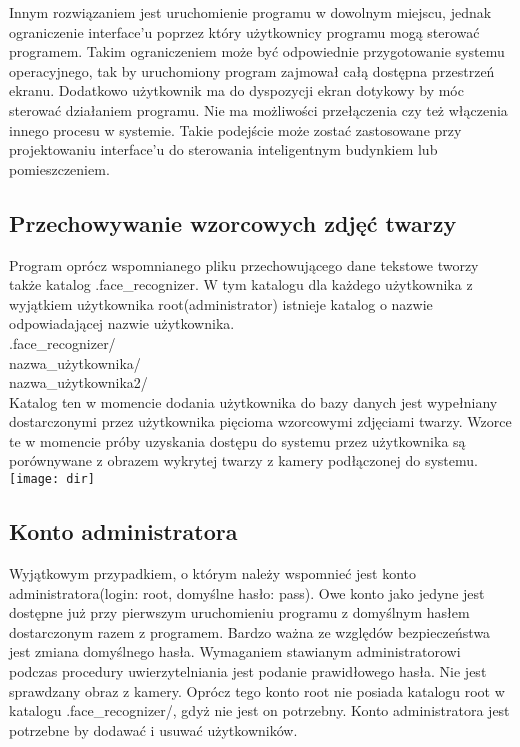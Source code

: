 \documentclass[eng,printmode]{mgr}
\begin{document}
Innym rozwiązaniem jest uruchomienie programu w dowolnym miejscu, jednak ograniczenie interface'u poprzez który użytkownicy programu mogą sterować programem. Takim ograniczeniem może być odpowiednie przygotowanie systemu operacyjnego, tak by uruchomiony program zajmował całą dostępna przestrzeń ekranu. Dodatkowo użytkownik ma do dyspozycji ekran dotykowy by móc sterować działaniem programu. Nie ma możliwości przełączenia czy też włączenia innego procesu w systemie. Takie podejście może zostać zastosowane przy projektowaniu interface'u do sterowania inteligentnym budynkiem lub pomieszczeniem.

\subsection{Przechowywanie wzorcowych zdjęć twarzy}
Program oprócz wspomnianego pliku przechowującego dane tekstowe tworzy także katalog .face\_recognizer. W tym katalogu dla każdego użytkownika z wyjątkiem użytkownika root(administrator) istnieje katalog o nazwie odpowiadającej nazwie użytkownika.
\\
.face\_recognizer/\\
\textbullet nazwa\_użytkownika/\\
\textbullet nazwa\_użytkownika2/\\

Katalog ten w momencie dodania użytkownika do bazy danych jest wypełniany dostarczonymi przez użytkownika  pięcioma wzorcowymi zdjęciami twarzy. Wzorce te w momencie próby uzyskania dostępu do systemu przez użytkownika są porównywane z obrazem wykrytej twarzy z kamery podłączonej do systemu.\\
\texttt{[image: dir]}
\subsection{Konto administratora}
Wyjątkowym przypadkiem, o którym należy wspomnieć jest konto administratora(login: root, domyślne hasło: pass). Owe konto jako jedyne jest dostępne już przy pierwszym uruchomieniu programu z domyślnym hasłem dostarczonym razem z programem. Bardzo ważna ze względów bezpieczeństwa jest zmiana domyślnego hasła. Wymaganiem stawianym administratorowi podczas procedury uwierzytelniania jest podanie prawidłowego hasła. Nie jest sprawdzany obraz z kamery. Oprócz tego konto root nie posiada katalogu root w katalogu .face\_recognizer/, gdyż nie jest on potrzebny. Konto administratora jest potrzebne by dodawać i usuwać użytkowników.
\end{document}
